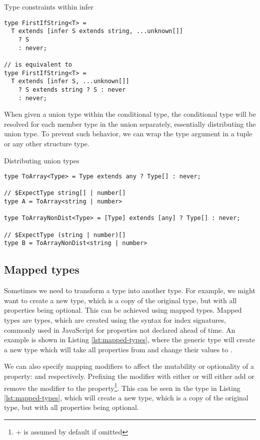 \begin{listing}[h]
  \caption{Type constraints within infer}\label{lst:infer-constraint}
  \begin{verbatim}
type FirstIfString<T> =
  T extends [infer S extends string, ...unknown[]]
    ? S
    : never;

// is equivalent to 
type FirstIfString<T> =
  T extends [infer S, ...unknown[]]
    ? S extends string ? S : never
    : never;
\end{verbatim}
\end{listing}

When given a union type within the conditional type, the conditional type will be resolved for each member type in the union separately, essentially distributing the union type. To prevent such behavior, we can wrap the type argument in a tuple or any other structure type.

\begin{listing}[h]
  \caption{Distributing union types}\label{lst:distribute}
  \begin{verbatim}
type ToArray<Type> = Type extends any ? Type[] : never;

// $ExpectType string[] | number[]
type A = ToArray<string | number> 

type ToArrayNonDist<Type> = [Type] extends [any] ? Type[] : never;

// $ExpectType (string | number)[]
type B = ToArrayNonDist<string | number> 

\end{verbatim}
\end{listing}

\subsection{Mapped types}

Sometimes we need to transform a type into another type. For example, we might want to create a new type, which is a copy of the original type, but with all properties being optional. This can be achieved using mapped types. Mapped types are types, which are created using the syntax for index signatures, commonly used in JavaScript for properties not declared ahead of time. An example is shown in Listing \ref{lst:mapped-types}, where the generic type  will create a new type which will take all properties from  and change their values to .

We can also specify mapping modifiers to affect the mutability or optionality of a property:  and  respectively. Prefixing the modifier with either \code{+} or \code{-} will either add or remove the modifier to the property\footnote{+ is assumed by default if omitted}. This can be seen in the  type in Listing \ref{lst:mapped-types}, which will create a new type, which is a copy of the original type, but with all properties being optional.

